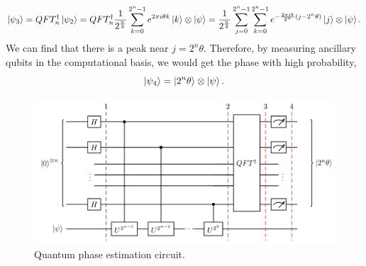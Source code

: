 \documentclass[a4paper]{article}
\begin{document}
    \begin{equation} \label{eq:eq7}
    \setlength{\jot}{10pt}
        \ket{\psi_3}   =   QFT^\dagger_n   \ket{\psi_2}
        = QFT^\dagger_n   \frac{1}{2^{\frac{n}{2}}}   \sum_{k=0}^{2^n - 1}   e^{2 \pi i \theta k} \ket{k}   \otimes \ket{\psi}
        = \frac{1}{2^{\frac{n}{2}}}    \sum_{j=0}^{2^n - 1}   \sum_{k=0}^{2^n - 1}   e^{ -\frac{2 \pi i k}{2^n} (j - 2^n \theta)} \ket{j}   \otimes \ket{\psi}.
    \end{equation}
    We can find that there is a peak near $j = 2^n \theta$. Therefore, by measuring ancillary qubits in the computational basis, we would get the phase with high probability,
    \begin{equation} \label{eq:eq8}
        \ket{\psi_4}   =   \ket{2^n \theta} \otimes \ket{\psi}.
    \end{equation}

    \begin{figure}
        \centering
            \includegraphics [width=\textwidth, height=\textheight, keepaspectratio] {qpe_tex_qz.png}
        \caption{Quantum phase estimation circuit.\cite{Qiskit-Textbook}}
        \label{fig:qpe}
    \end{figure}




\end{document}
